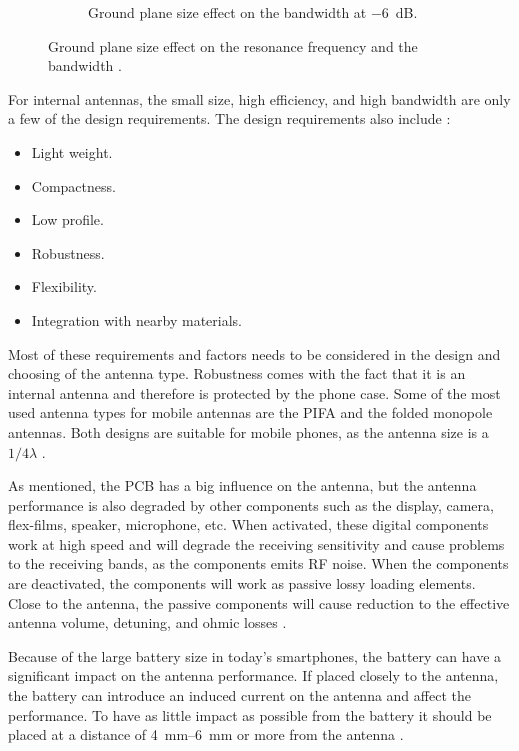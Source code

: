 \begin{figure}[htbp]
\begin{subfigure}[b]{0.49\linewidth}
        \caption{Ground plane size effect on the bandwidth at \SI{-6}{dB}.}
    \end{subfigure}
    \caption{Ground plane size effect on the resonance frequency and the bandwidth \cite{sanchez2008multiband}.}
    \label{fig:antenna_pcb_behavior}
\end{figure}

For internal antennas, the small size, high efficiency, and high bandwidth are only a few of the design requirements. The design requirements also include \cite{fujimoto2008mobile}:
\begin{itemize}
\item Light weight.
\item Compactness.
\item Low profile.
\item Robustness.
\item Flexibility.
\item Integration with nearby materials.
\end{itemize}
Most of these requirements and factors needs to be considered in the design and choosing of the antenna type. Robustness comes with the fact that it is an internal antenna and therefore is protected by the phone case. Some of the most used antenna types for mobile antennas are the PIFA and the folded monopole antennas. Both designs are suitable for mobile phones, as the antenna size is a $1/4 \lambda$ \cite{fujimoto2008mobile}.

As mentioned, the PCB has a big influence on the antenna, but the antenna performance is also degraded by other components such as the display, camera, flex-films, speaker, microphone, etc. When activated, these digital components work at high speed and will degrade the receiving sensitivity and cause problems to the receiving bands, as the components emits RF noise. When the components are deactivated, the components will work as passive lossy loading elements. Close to the antenna, the passive components will cause reduction to the effective antenna volume, detuning, and ohmic losses \cite{fujimoto2008mobile}.

Because of the large battery size in today's smartphones, the battery can have a significant impact on the antenna performance. If placed closely to the antenna, the battery can introduce an induced current on the antenna and affect the performance. To have as little impact as possible from the battery it should be placed at a distance of \SIrange{4}{6}{mm} or more from the antenna \cite{fujimoto2008mobile}. 

